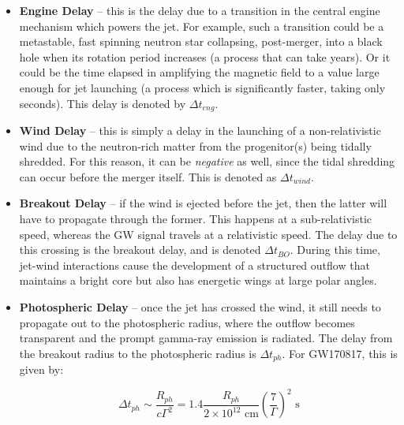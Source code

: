     \begin{itemize}

        \item \textbf{Engine Delay} -- this is the delay due to a transition in the
            central engine mechanism which powers the jet. For example, such a
            transition could be a metastable, fast spinning neutron star collapsing,
            post-merger, into a black hole when its rotation period increases (a process
            that can take years). Or it could be the time elapsed in amplifying the
            magnetic field to a value large enough for jet launching (a process which is
            significantly faster, taking only seconds). This delay is denoted by $\Delta
            t_{eng}$.

        \item \textbf{Wind Delay} -- this is simply a delay in the launching of a
            non-relativistic wind due to the neutron-rich matter from the progenitor(s)
            being tidally shredded. For this reason, it can be \textit{negative} as
            well, since the tidal shredding can occur before the merger itself. This is
            denoted as $\Delta t_{wind}$.

        \item \textbf{Breakout Delay} -- if the wind is ejected before the jet, then the
            latter will have to propagate through the former. This happens at a
            sub-relativistic speed, whereas the GW signal travels at a relativistic
            speed. The delay due to this crossing is the breakout delay, and is denoted
            $\Delta t_{BO}$. During this time, jet-wind interactions cause the
            development of a structured outflow that maintains a bright core but also
            has energetic wings at large polar angles.

        \item \textbf{Photospheric Delay} --  once the jet has crossed the wind, it
            still needs to propagate out to the photospheric radius, where the outflow
            becomes transparent and the prompt gamma-ray emission is radiated. The delay
            from the breakout radius to the photospheric radius is $\Delta t_{ph}$. For
            GW170817, this is given by:

            \begin{equation}
                \label{eq:4}
                \Delta t_{ph} \sim \dfrac{R_{ph}}{c \Gamma^2} =
                    1.4 \dfrac{R_{ph}}{2 \times 10^{12} \text{ cm}}
                    \left(
                            \dfrac{7}{\Gamma}
                    \right)^2 \text{ s}
            \end{equation}


\end{itemize}
